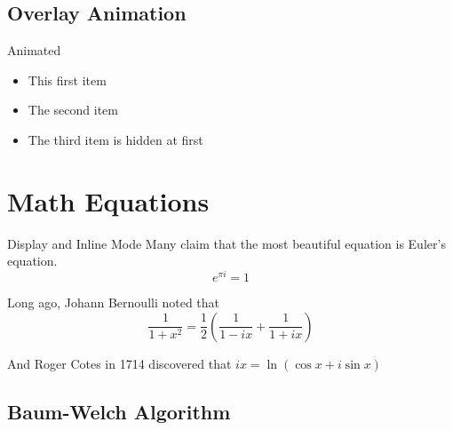 \documentclass[10pt]{beamer}
\begin{document}
\subsection{Overlay Animation}

\begin{frame}{Animated}
  \begin{itemize}
    \item <1-> This first item
    \item <1-> The second item
    \item <2-> The third item is hidden at first
  \end{itemize}
\end{frame}

\section{Math Equations}

\begin{frame}{Display and Inline Mode}
  Many claim that the most beautiful equation is Euler's equation.
  \[ e^{\pi i} = 1 \]

  Long ago, Johann Bernoulli noted that
  $$ \frac{1}{1+x^2} = \frac{1}{2}\left( \frac{1}{1-ix} + \frac{1}{1+ix} \right) $$

  And Roger Cotes in 1714 discovered that $ ix = \ln(\cos x + i \sin x) $
\end{frame}

\subsection{Baum-Welch Algorithm}
\end{document}
